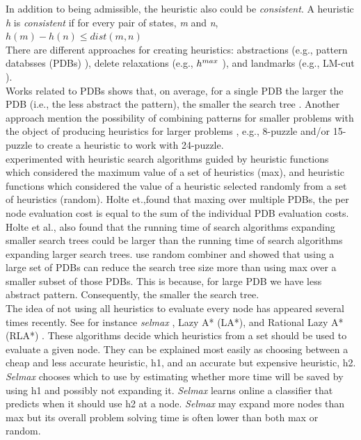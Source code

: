 \documentclass[a4paper,12pt]{article}
\begin{document}
In addition to being admissible, the heuristic also could be \textit{consistent}. A heuristic \textit{h} is \textit{consistent} if for every pair of states, \textit{m} and \textit{n}, $h(m) - h(n) \leq dist(m, n)$\\

There are different approaches for creating heuristics: abstractions (e.g., pattern databsses (PDBs) \citep{culberson1996searching}), delete relaxations (e.g., $h\sp{max}$ \citep{bonet2001planning}), and landmarks (e.g., LM-cut \citep{helmert2009landmarks}).\\

Works related to PDBs shows that, on average, for a single PDB the larger the PDB (i.e., the less abstract the pattern), the smaller the search tree \citep{holte1999space}. Another approach mention the possibility of combining patterns for smaller problems with the object of producing heuristics for larger problems \citep{culberson1998pattern}, e.g., 8-puzzle and/or 15-puzzle to create a heuristic to work with 24-puzzle.\\

\citep{holte2004multiple} experimented with heuristic search algorithms guided by heuristic functions which considered the maximum value of a set of heuristics (max), and heuristic functions which considered the value of a heuristic selected randomly from a set of heuristics (random). Holte et.,found that maxing over multiple PDBs, the per node evaluation cost is equal to the sum of the individual PDB evaluation costs. Holte et al., also found that the running time of search algorithms expanding smaller search trees could be larger than the running time of search algorithms expanding larger search trees. \citep{zahavi2007inconsistent} use random combiner and showed that using a large set of PDBs can reduce the search tree size more than using max over a smaller subset of those PDBs. This is because, for large PDB we have less abstract pattern. Consequently, the smaller the search tree.\\

The idea of not using all heuristics to evaluate every node has appeared several times recently. See for instance \textit{selmax} \citet{domshlak2011selmax}, Lazy A* (LA*), and Rational Lazy A* (RLA*) \citep{tolpin2013towards}. These algorithms decide which heuristics from a set should be used to evaluate a given node. They can be explained most easily as choosing between a cheap and less accurate heuristic, h1, and an accurate but expensive heuristic, h2. \textit{Selmax} chooses which to use by estimating whether more time will be saved by using h1 and possibly not expanding it. \textit{Selmax} learns online a classifier that predicts when it should use h2 at a node. \textit{Selmax} may expand more nodes than max but its overall problem solving time is often lower than both max or random.\\
\end{document}
